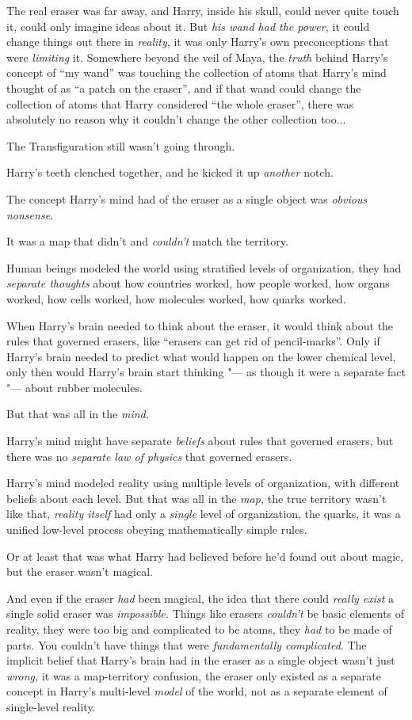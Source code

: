 The real eraser was far away, and Harry, inside his skull, could never
quite touch it, could only imagine ideas about it. But \emph{his wand
had the power,} it could change things out there in \emph{reality}, it
was only Harry's own preconceptions that were \emph{limiting} it.
Somewhere beyond the veil of Maya, the \emph{truth} behind Harry's
concept of ``my wand'' was touching the collection of atoms that Harry's
mind thought of as ``a patch on the eraser'', and if that wand could
change the collection of atoms that Harry considered ``the whole
eraser'', there was absolutely no reason why it couldn't change the
other collection too...

The Transfiguration still wasn't going through.

Harry's teeth clenched together, and he kicked it up \emph{another}
notch.

The concept Harry's mind had of the eraser as a single object was
\emph{obvious nonsense.}

It was a map that didn't and \emph{couldn't} match the territory.

Human beings modeled the world using stratified levels of organization,
they had \emph{separate thoughts} about how countries worked, how people
worked, how organs worked, how cells worked, how molecules worked, how
quarks worked.

When Harry's brain needed to think about the eraser, it would think
about the rules that governed erasers, like ``erasers can get rid of
pencil-marks''. Only if Harry's brain needed to predict what would
happen on the lower chemical level, only then would Harry's brain start
thinking "--- as though it were a separate fact "--- about rubber molecules.

But that was all in the \emph{mind.}

Harry's mind might have separate \emph{beliefs} about rules that
governed erasers, but there was no \emph{separate law of physics} that
governed erasers.

Harry's mind modeled reality using multiple levels of organization, with
different beliefs about each level. But that was all in the \emph{map,}
the true territory wasn't like that, \emph{reality itself} had only a
\emph{single} level of organization, the quarks, it was a unified
low-level process obeying mathematically simple rules.

Or at least that was what Harry had believed before he'd found out about
magic, but the eraser wasn't magical.

And even if the eraser \emph{had} been magical, the idea that there
could \emph{really exist} a single solid eraser was \emph{impossible.}
Things like erasers \emph{couldn't} be basic elements of reality, they
were too big and complicated to be atoms, they \emph{had} to be made of
parts\emph{.} You couldn't have things that were \emph{fundamentally
complicated}. The implicit belief that Harry's brain had in the eraser
as a single object wasn't just \emph{wrong,} it was a map-territory
confusion, the eraser only existed as a separate concept in Harry's
multi-level \emph{model} of the world, not as a separate element of
single-level reality.

